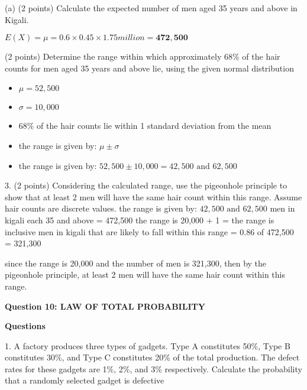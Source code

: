 \documentclass{article}
\begin{document}
(a) (2 points) Calculate the expected number of men aged 35 years and above in Kigali.

\(E(X) = \mu = 0.6 \times 0.45 \times 1.75 million = \mathbf{472,500}\) \newline

(2 points) Determine the range within which approximately 68\% of the hair counts for men aged 35 years and above lie, using the given normal distribution

\begin{itemize}
    \item \(\mu = 52,500\)
    \item \(\sigma = 10,000\)
    \item 68\% of the hair counts lie within 1 standard deviation from the mean
    \item the range is given by: \(\mu \pm \sigma\)
    \item the range is given by: \(52,500 \pm 10,000 = 42,500 \text{ and } 62,500\)
\end{itemize}

3. (2 points) Considering the calculated range, use the pigeonhole principle to show that at
least 2 men will have the same hair count within this range. Assume hair counts are discrete
values.\newline\newline
the range is given by: \(42,500 \text{ and } 62,500\)\newline
men in kigali each 35 and above = 472,500\newline
the range is 20,000 + 1 = the range is inclusive\newline
men in kigali that are likely to fall within this range = 0.86 of 472,500 = 321,300\newline

since the range is 20,000 and the number of men is 321,300, then by the pigeonhole principle, at least 2 men will have the same hair count within this range.\newline




\begin{center}
    \large \textbf{Question 10: LAW OF TOTAL PROBABILITY}
\end{center}

\textbf{Questions}

1. A factory produces three types of gadgets. Type A constitutes 50\%, Type B constitutes 30\%, and Type C constitutes 20\% of the total production. The defect rates for these gadgets are 1\%, 2\%, and 3\% respectively. Calculate the probability that a randomly selected gadget is defective
\end{document}
